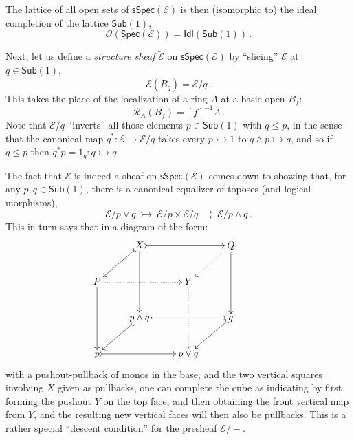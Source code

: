 \documentclass[12pt]{article}
\newcommand{\E}{\ensuremath{\mathcal{E}}}
\newcommand{\mono}{\ensuremath{\rightarrowtail}}
\theoremstyle{remark}
\theoremstyle{definition}
\begin{document}
The lattice of all open sets of $\mathsf{sSpec}(\E)$ is then (isomorphic to) the ideal completion of the lattice $\mathsf{Sub}(1)$,
$$\mathcal{O}(\mathsf{Spec}(\E)) = \mathsf{Idl}(\mathsf{Sub}(1))\,.$$

%



Next, let us define a \emph{structure sheaf} $\widetilde{\E}$ on $\mathsf{sSpec}(\E)$ by ``slicing'' $\E$ at $q \in\mathsf{Sub}(1)$,
\[
\widetilde{\E}(B_q) = \E/q\,.
\]
This takes the place of the localization of a ring $A$ at a basic open $B_f$:
\[
\mathcal{R}_A(B_f) = [f]^{-1}A\,.
\]
Note that $\E/q$ ``inverts'' all those elements $p\in \mathsf{Sub}(1)$ with $q\leq p$, in the sense that the canonical map 
$q^* : \E \to \E/q$ takes every $p \mono 1$ to $q\wedge p \mono q$, and so if $q\leq p$ then $q^*p = 1_q : q \mono q$.

The fact that $\widetilde{\E}$ is indeed a sheaf on $\mathsf{sSpec}(\E)$ comes down to showing that, for any $p, q \in \mathsf{Sub}(1)$, there is a canonical equalizer of toposes (and logical morphisms),
\[
\E/p\vee q\ \mono\ \E/p \times \E/q\ \rightrightarrows\ \E/p\wedge q \,.
\]
This in turn says that in a diagram of the form: 
 \[ 
 \xymatrix{ 
& X \ar@{>->}[ld] \ar[dd] \ar@{>->}[rr] && Q \ar@{.>}[ld] \ar[dd] & \\
 P \ar[dd] \ar@{.>}[rr] && Y \ar@{.>}[dd]\\ 
 & p \wedge q \ar@{>->}[ld] \ar@{>->}[rr] && q \ar@{>->}[ld] & \\
  p \ar@{>->}[rr] && p\vee q} 
 \] 
 with a pushout-pullback of monos in the base, and the two vertical squares involving $X$ given as pullbacks, one can complete the cube as indicating by first forming the pushout $Y$ on the top face, and then obtaining the front vertical map from $Y$, and the resulting new vertical faces will then also be pullbacks. This is a rather special ``descent condition'' for the presheaf $\E/-$.
 
\end{document}
